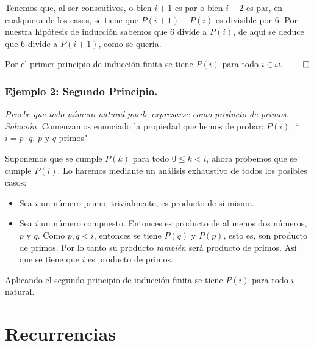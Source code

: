 \documentclass[a4paper]{article}
\theoremstyle{plain} \newtheorem{PrimerPrincipio}{Teorema}
\theoremstyle{plain} \newtheorem{SegundoPrincipio}{Teorema}
\begin{document}
Tenemos que, al ser conseutivos, o bien $i+1$ es par o bien $i+2$ es par, en cualquiera de los casos, se tiene que $P(i+1) - P(i)$ es divisible por $6$. Por nuestra hipótesis de inducción sabemos que 6 divide a $P(i)$, de aquí se deduce que 6 divide a $P(i+1)$, como se quería.

Por el primer principio de inducción finita se tiene $P(i)$ para todo $i\in\omega$. $\qed$

\subsubsection*{Ejemplo 2: Segundo Principio.} \emph{Pruebe que todo número natural puede expresarse como producto de primos.}\\

\emph{Solución.} Comenzamos enunciado la propiedad que hemos de probar: $P(i)$: ``$i=p\cdot q$, $p$ y $q$ primos"

Suponemos que se cumple $P(k)$ para todo $0 \le k < i$, ahora probemos que se cumple $P(i)$. Lo haremos mediante un análisis exhaustivo de todos los posibles casos:

\begin{itemize}
				\item Sea $i$ un número primo, trivialmente, es producto de sí mismo.
				\item Sea $i$ un número compuesto. Entonces es producto de al menos dos números, $p$ y $q$. Como $p,q < i$, entonces se tiene $P(q)$ y $P(p)$, esto es, son producto de primos. Por lo tanto su producto \emph{también} será producto de primos. Así que se tiene que $i$ es producto de primos.
\end{itemize}

Aplicando el segundo principio de inducción finita se tiene $P(i)$ para todo $i$ natural.

\section{Recurrencias}
\end{document}
